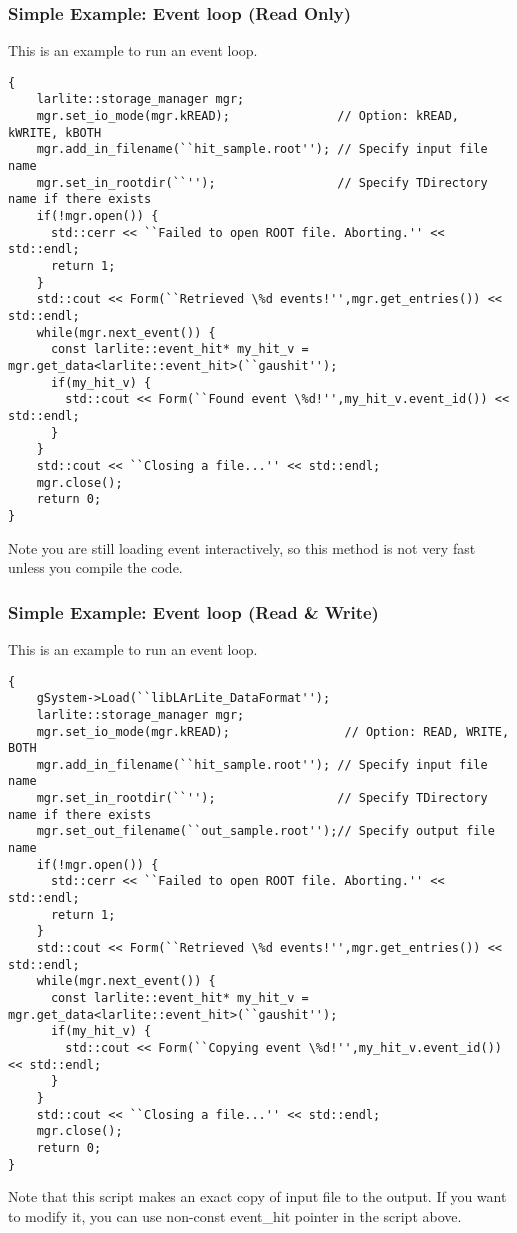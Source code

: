 \subsubsection{Simple Example: Event loop (Read Only)}
This is an example to run an event loop.
\begin{lstlisting}
{
    larlite::storage_manager mgr;
    mgr.set_io_mode(mgr.kREAD);               // Option: kREAD, kWRITE, kBOTH
    mgr.add_in_filename(``hit_sample.root''); // Specify input file name
    mgr.set_in_rootdir(``'');                 // Specify TDirectory name if there exists
    if(!mgr.open()) {
      std::cerr << ``Failed to open ROOT file. Aborting.'' << std::endl;
      return 1;
    }
    std::cout << Form(``Retrieved \%d events!'',mgr.get_entries()) << std::endl;
    while(mgr.next_event()) {
      const larlite::event_hit* my_hit_v = mgr.get_data<larlite::event_hit>(``gaushit'');
      if(my_hit_v) {
        std::cout << Form(``Found event \%d!'',my_hit_v.event_id()) << std::endl;
      }
    }
    std::cout << ``Closing a file...'' << std::endl;
    mgr.close();
    return 0;
}
\end{lstlisting}
Note you are still loading event interactively, so this method is not very fast unless you compile the code.

\subsubsection{Simple Example: Event loop (Read \& Write)}
This is an example to run an event loop.
\begin{lstlisting}
{
    gSystem->Load(``libLArLite_DataFormat'');
    larlite::storage_manager mgr;
    mgr.set_io_mode(mgr.kREAD);                // Option: READ, WRITE, BOTH
    mgr.add_in_filename(``hit_sample.root''); // Specify input file name
    mgr.set_in_rootdir(``'');                 // Specify TDirectory name if there exists
    mgr.set_out_filename(``out_sample.root'');// Specify output file name
    if(!mgr.open()) {
      std::cerr << ``Failed to open ROOT file. Aborting.'' << std::endl;
      return 1;
    }
    std::cout << Form(``Retrieved \%d events!'',mgr.get_entries()) << std::endl;
    while(mgr.next_event()) {
      const larlite::event_hit* my_hit_v = mgr.get_data<larlite::event_hit>(``gaushit'');
      if(my_hit_v) {
        std::cout << Form(``Copying event \%d!'',my_hit_v.event_id()) << std::endl;
      }
    }
    std::cout << ``Closing a file...'' << std::endl;
    mgr.close();
    return 0;
}
\end{lstlisting}
Note that this script makes an exact copy of input file to the output.
If you want to modify it, you can use non-const {\ttfamily event\_hit} pointer in the script above.



